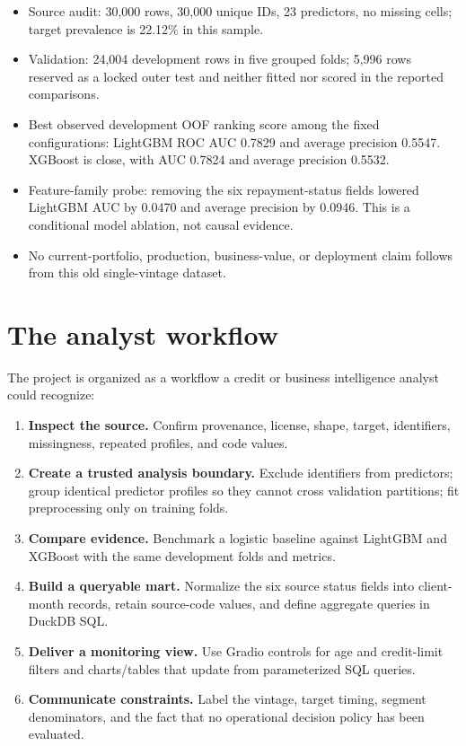 \documentclass[11pt,letterpaper]{article}
\begin{document}
\begin{itemize}
  \item Source audit: 30,000 rows, 30,000 unique IDs, 23 predictors, no missing cells; target prevalence is 22.12\% in this sample.
  \item Validation: 24,004 development rows in five grouped folds; 5,996 rows reserved as a locked outer test and neither fitted nor scored in the reported comparisons.
  \item Best observed development OOF ranking score among the fixed configurations: LightGBM ROC AUC 0.7829 and average precision 0.5547. XGBoost is close, with AUC 0.7824 and average precision 0.5532.
  \item Feature-family probe: removing the six repayment-status fields lowered LightGBM AUC by 0.0470 and average precision by 0.0946. This is a conditional model ablation, not causal evidence.
  \item No current-portfolio, production, business-value, or deployment claim follows from this old single-vintage dataset.
\end{itemize}

\section{The analyst workflow}
The project is organized as a workflow a credit or business intelligence analyst could recognize:
\begin{enumerate}
  \item \textbf{Inspect the source.} Confirm provenance, license, shape, target, identifiers, missingness, repeated profiles, and code values.
  \item \textbf{Create a trusted analysis boundary.} Exclude identifiers from predictors; group identical predictor profiles so they cannot cross validation partitions; fit preprocessing only on training folds.
  \item \textbf{Compare evidence.} Benchmark a logistic baseline against LightGBM and XGBoost with the same development folds and metrics.
  \item \textbf{Build a queryable mart.} Normalize the six source status fields into client-month records, retain source-code values, and define aggregate queries in DuckDB SQL.
  \item \textbf{Deliver a monitoring view.} Use Gradio controls for age and credit-limit filters and charts/tables that update from parameterized SQL queries.
  \item \textbf{Communicate constraints.} Label the vintage, target timing, segment denominators, and the fact that no operational decision policy has been evaluated.
\end{enumerate}
\end{document}
